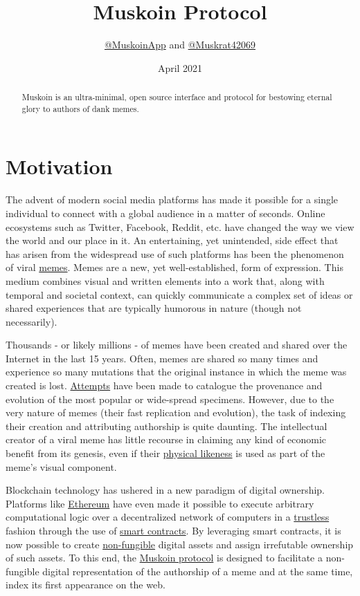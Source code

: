 \documentclass{article}
\title{Muskoin Protocol}
\author{\href{http://www.twitter.com/MuskoinApp}{@MuskoinApp} and \href{http://www.twitter.com/Muskrat42069}{@Muskrat42069}}
\date{April 2021}
\begin{document}
\maketitle

\begin{abstract}

Muskoin is an ultra-minimal, open source interface and protocol for bestowing eternal glory to authors of dank memes.

\end{abstract}

\section{Motivation}
The advent of modern social media platforms has made it possible for a single individual to connect with a global audience in a matter of seconds. Online ecosystems 
such as Twitter, Facebook, Reddit, etc. have changed the way we view the world and our place in it. An entertaining, yet unintended, side effect that has arisen from 
the widespread use of such platforms has been the phenomenon of viral \href{https://en.wikipedia.org/wiki/Meme}{memes}. Memes are a new, yet well-established, form of expression. This medium combines visual and written elements into a work that, along with temporal and societal context, can quickly communicate a complex set of ideas or shared experiences that 
are typically humorous in nature (though not necessarily). 

Thousands - or likely millions - of memes have been created and shared over the Internet in the last 15 years. Often, memes are shared so many times and experience so many mutations
that the original instance in which the meme was created is lost. \href{https://knowyourmeme.com/ }{Attempts} have been made to catalogue the provenance and evolution of the most popular or wide-spread specimens. However, due to the very nature of memes (their fast replication and evolution), the task of indexing their creation and attributing authorship is quite daunting. The intellectual creator of a viral meme has little recourse in claiming any kind of economic benefit from its genesis, even if their \href{https://en.wikipedia.org/wiki/Bad_Luck_Brian}{physical likeness} is used as
part of the meme's visual component. 

Blockchain technology has ushered in a new paradigm of digital ownership. Platforms like \href{https://ethereum.org/en/}{Ethereum} have even made it possible 
to execute arbitrary computational logic over a decentralized network of computers in a 
\href{https://www.nananke.com/single-post/2018/08/07/zero-trust-vs-trustless-systems}{trustless} fashion through the use of 
\href{https://en.wikipedia.org/wiki/Smart_contract}{smart contracts}. By leveraging smart contracts, it is now possible to create 
\href{https://www.investopedia.com/terms/f/fungibility.asp}{non-fungible} digital assets and assign irrefutable ownership of such assets. To this end, the 
\href{https://muskoin.app}{Muskoin protocol} is designed to facilitate a non-fungible digital representation of the authorship of a meme and at the same 
time, index its first appearance on the web.
\end{document}
